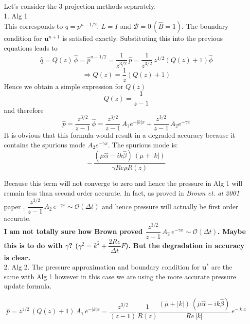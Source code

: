 Let's consider the 3 projection methods separately.\\
1. Alg 1\\
This corresponds to $q = p^{n-1/2}$, $L = I$ and $\mathcal{B} = 0 \, (\hat{B} = 1)$. The boundary condition for $\textbf{u}^{n+1}$ is satisfied exactly. Substituting this into the previous equations leads to
\begin{equation*}
\hat{q} = Q(z)\,\hat{\phi} = \hat{p}^{n-1/2} = \dfrac{1}{z^{3/2}}\,\hat{p} = \dfrac{1}{z^{3/2}} \, z^{1/2} (Q(z) + 1) \hat{\phi}
\end{equation*}
\begin{equation*}
\Rightarrow Q(z) = \dfrac{1}{z} (Q(z) + 1)
\end{equation*}
Hence we obtain a simple expression for $Q(z)$
\begin{equation}
Q(z) = \dfrac{1}{z-1}
\end{equation}
and therefore
\begin{equation}
\hat{p} = \dfrac{z^{3/2}}{z-1} \, \hat{\phi} = \dfrac{z^{3/2}}{z-1}\, A_1 e^{-|k|x} + \dfrac{z^{3/2}}{z-1} \, A_2 e^{-\gamma x}
\end{equation}
It is obvious that this formula would result in a degraded accuracy because it contains the spurious mode $A_2 e^{-\gamma x}$. The spurious mode is:
\begin{equation*}
- \, \dfrac{(\bar{\mu} \hat{\alpha} - ik \hat{\beta})\,(\bar{\mu} + |k|)}{\gamma Re \rho R(z)}
\end{equation*}

Because this term will not converge to zero and hence the pressure in Alg 1 will remain less than second order accurate. In fact, as proved in \emph{Brown et. al 2001} paper \cite{brown2001accurate}, $\dfrac{z^{3/2}}{z-1}\,A_2 \,e^{-\gamma x} \sim \mathcal{O} (\Delta t)$ and hence pressure will actually be first order accurate.\\
\textbf{I am not totally sure how Brown proved $\dfrac{z^{3/2}}{z-1}\,A_2 \,e^{-\gamma x} \sim \mathcal{O} (\Delta t)$. Maybe this is to do with $\gamma$? ($\gamma^2 = k^2 + \dfrac{2Re}{\Delta t}F$). But the degradation in accuracy is clear. }\\

2. Alg 2. The pressure approximation and boundary condition for $\textbf{u}^*$ are the same with Alg 1 however in this case we are using the more accurate pressure update formula. 

\begin{dmath}
\hat{p} = z^{1/2}\,(Q(z) + 1)\,A_1\,e^{-|k|x}
= \dfrac{z^{3/2}}{(z-1)} \dfrac{1}{R(z)} \dfrac{(\bar{\mu} + |k|)\,(\bar{\mu} \hat{\alpha}  -ik \hat{\beta})}{Re\,|k|}\,e^{-|k|x}
\end{dmath}

